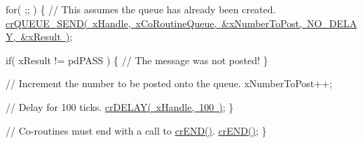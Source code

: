 \begin{DoxyPre}   for( ;; )
   \{
       // This assumes the queue has already been created.
       \mbox{\hyperlink{croutine_8h_a26af3d36f22a04168eebdf5b08465d6e}{crQUEUE\_SEND( xHandle, xCoRoutineQueue, \&xNumberToPost, NO\_DELAY, \&xResult )}};\end{DoxyPre}



\begin{DoxyPre}       if( xResult != pdPASS )
       \{
           // The message was not posted!
       \}\end{DoxyPre}



\begin{DoxyPre}       // Increment the number to be posted onto the queue.
       xNumberToPost++;\end{DoxyPre}



\begin{DoxyPre}       // Delay for 100 ticks.
       \mbox{\hyperlink{croutine_8h_a05a06feb11028f2d1d440ea335f562ba}{crDELAY( xHandle, 100 )}};
   \}\end{DoxyPre}



\begin{DoxyPre}   // Co-routines must end with a call to \mbox{\hyperlink{croutine_8h_ae6038cc976689b50000475ebfc4e2f23}{crEND()}}.
   \mbox{\hyperlink{croutine_8h_ae6038cc976689b50000475ebfc4e2f23}{crEND()}};
\}\end{DoxyPre}
 
